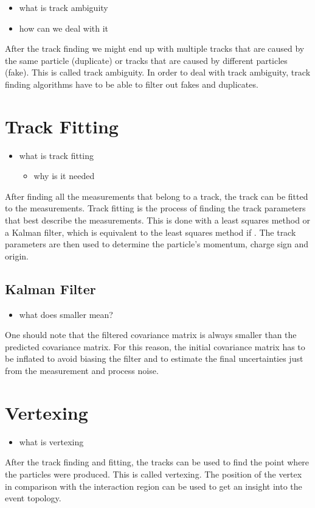 \begin{itemize}
    \color{red}
    \item what is track ambiguity
    \item how can we deal with it
\end{itemize}

After the track finding we might end up with multiple tracks that are caused by the same particle (duplicate) or tracks that are caused by different particles (fake). This is called track ambiguity. In order to deal with track ambiguity, track finding algorithms have to be able to filter out fakes and duplicates.

\section{Track Fitting}

\begin{itemize}
    \color{red}
    \item what is track fitting
    \begin{itemize}
        \item why is it needed
    \end{itemize}
\end{itemize}

After finding all the measurements that belong to a track, the track can be fitted to the measurements. Track fitting is the process of finding the track parameters that best describe the measurements. This is done with a least squares method or a Kalman filter, which is equivalent to the least squares method if \color{red}{???}. The track parameters are then used to determine the particle's momentum, charge sign and origin.

\subsection{Kalman Filter}

\begin{itemize}
    \color{red}
    \item what does smaller mean?
\end{itemize}

One should note that the filtered covariance matrix is always smaller than the predicted covariance matrix. For this reason, the initial covariance matrix has to be inflated to avoid biasing the filter and to estimate the final uncertainties just from the measurement and process noise.

\section{Vertexing}

\begin{itemize}
    \color{red}
    \item what is vertexing
\end{itemize}

After the track finding and fitting, the tracks can be used to find the point where the particles were produced. This is called vertexing. The position of the vertex in comparison with the interaction region can be used to get an insight into the event topology.
